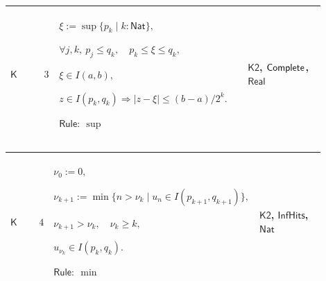 \documentclass[12pt,reqno]{amsart}
\theoremstyle{blueplain}
\numberwithin{equation}{section}
\begin{document}
{\scriptsize \setlength{\parskip}{0pt}\nointerlineskip
\noindent 
\begin{tabular}{|@{}>{\centering\arraybackslash}m{0.10658\linewidth}|>{\centering\arraybackslash}m{0.03553\linewidth}|>{\centering\arraybackslash}m{0.52105\linewidth}|>{\centering\arraybackslash}m{0.23684\linewidth}|}
\hline
\hypertarget{proof:K3}{$\displaystyle \mathsf{K}$} & $\displaystyle 3$ & $%
\displaystyle \xi:=\sup\{p_k\mid k:\mathsf{Nat}\},$\par$\displaystyle %
\forall j,k,\ p_j\le q_k,\quad p_k\le\xi\le q_k,$\par$\displaystyle \xi\in
I(a,b),$\par$\displaystyle z\in I(p_k,q_k)\Rightarrow|z-\xi|\le(b-a)/2^k.$%
\par$\displaystyle \mathsf{Rule}:\ \sup$ & \hyperlink{proof:K2}{$%
\displaystyle \mathsf{K2}$}, \hyperlink{ax:Complete}{$\displaystyle \mathsf{%
Complete}$}, \hyperlink{ax:Real}{$\displaystyle \mathsf{Real}$} \\ \hline
\end{tabular}%
}

{\scriptsize \setlength{\parskip}{0pt}\nointerlineskip
\noindent 
\begin{tabular}{|@{}>{\centering\arraybackslash}m{0.10658\linewidth}|>{\centering\arraybackslash}m{0.03553\linewidth}|>{\centering\arraybackslash}m{0.52105\linewidth}|>{\centering\arraybackslash}m{0.23684\linewidth}|}
\hline
\hypertarget{proof:K4}{$\displaystyle \mathsf{K}$} & $\displaystyle 4$ & $%
\displaystyle \nu_0:=0,$\par$\displaystyle \nu_{k+1}:=\min\{n>\nu_k\mid
u_n\in I(p_{k+1},q_{k+1})\},$\par$\displaystyle \nu_{k+1}>\nu_k,\quad\nu_k%
\ge k,$\par$\displaystyle u_{\nu_k}\in I(p_k,q_k).$\par$\displaystyle 
\mathsf{Rule}:\ \min$ & \hyperlink{proof:K2}{$\displaystyle \mathsf{K2}$}, 
\hyperlink{def:InfHits}{$\displaystyle \mathsf{InfHits}$}, \hyperlink{ax:Nat}%
{$\displaystyle \mathsf{Nat}$} \\ \hline
\end{tabular}%
}
\end{document}
